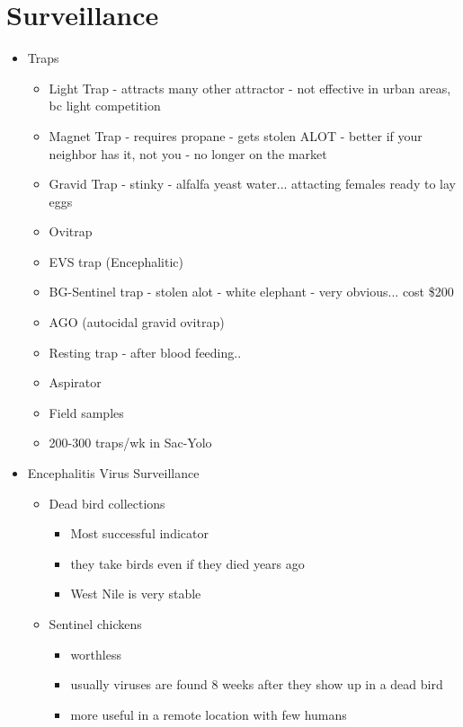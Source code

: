 \documentclass{article}
\begin{document}
    \section{Surveillance}
    \begin{itemize}
        \item Traps
        \begin{itemize}
            \item Light Trap - attracts many other attractor - not effective in urban areas, bc light competition
            \item Magnet Trap - requires propane - gets stolen ALOT - better if your neighbor has it, not you - no longer on the market
            \item Gravid Trap - stinky - alfalfa yeast water... attacting females ready to lay eggs
            \item Ovitrap
            \item EVS trap (Encephalitic)
            \item BG-Sentinel trap - stolen alot - white elephant - very obvious... cost \$200
            \item AGO (autocidal gravid ovitrap)
            \item Resting trap - after blood feeding..
            \item Aspirator
            \item Field samples
            \item 200-300 traps/wk in Sac-Yolo
        \end{itemize}
        \item Encephalitis Virus Surveillance
        \begin{itemize}
            \item Dead bird collections
            \begin{itemize}
                \item Most successful indicator
                \item they take birds even if they died years ago
                \item West Nile is very stable
            \end{itemize}
            \item Sentinel chickens
            \begin{itemize}
                \item worthless
                \item usually viruses are found 8 weeks after they show up in a dead bird
                \item more useful in a remote location with few humans

\end{itemize}
\end{itemize}
\end{itemize}
\end{document}
